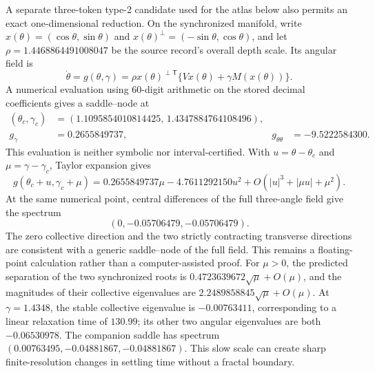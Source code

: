 \documentclass[11pt,a4paper]{article}
\theoremstyle{definition}
\newcommand{\T}{\mathsf T}
\begin{document}
A separate three-token type-2 candidate used for the atlas below also permits an
exact one-dimensional reduction.  On the synchronized manifold, write
$x(\theta)=(\cos\theta,\sin\theta)$ and
$x(\theta)^\perp=(-\sin\theta,\cos\theta)$, and let
$\rho=1.4468864491008047$ be the source record's overall depth scale.  Its angular
field is
\begin{equation}
 \dot\theta=g(\theta,\gamma)
 =\rho x(\theta)^{\perp\T}\{Vx(\theta)+\gamma M(x(\theta))\}.
 \label{eq:fractal-consensus-field}
\end{equation}
A numerical evaluation using 60-digit arithmetic on the stored decimal coefficients gives a
saddle--node at
\begin{align*}
 (\theta_c,\gamma_c)
 &= (1.1095854010814425,\,1.4347884764108496),\\
 g_\gamma&=0.2655849737,&
 g_{\theta\theta}&=-9.5222584300.
\end{align*}
This evaluation is neither symbolic nor interval-certified.  With
$u=\theta-\theta_c$ and $\mu=\gamma-\gamma_c$, Taylor expansion gives
\begin{equation}
 g(\theta_c+u,\gamma_c+\mu)
 =0.2655849737\mu-4.7611292150u^2
 +O(|u|^3+|\mu u|+\mu^2).
 \label{eq:fractal-saddle-node-normal-form}
\end{equation}
At the same numerical point, central differences of the full three-angle field give
the spectrum
\[
 (0,-0.05706479,-0.05706479).
\]
The zero collective direction and the two strictly contracting transverse directions
are consistent with a generic saddle--node of the full field.  This remains a
floating-point calculation rather than a computer-assisted proof.
For $\mu>0$, the predicted separation of the two synchronized roots is
$0.4723639672\sqrt\mu+O(\mu)$, and the magnitudes of their collective eigenvalues are
$2.2489858845\sqrt\mu+O(\mu)$.  At $\gamma=1.4348$, the stable collective eigenvalue
is $-0.00763411$, corresponding to a linear relaxation time of $130.99$; its other
two angular eigenvalues are both $-0.06530978$.  The companion saddle has spectrum
$(0.00763495,-0.04881867,-0.04881867)$.  This slow
scale can create sharp finite-resolution changes in settling time without a fractal
boundary.
\end{document}
